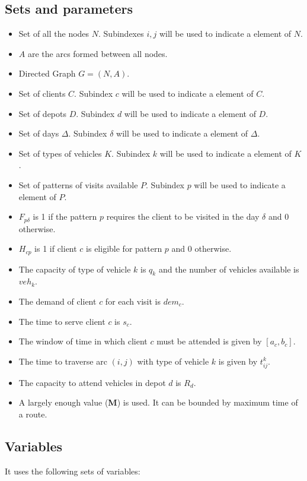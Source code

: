 \documentclass[preprint,review,12pt]{elsarticle}
\begin{document}
\subsection{Sets and parameters}
\begin{itemize}
	\item Set of all the nodes $N$. Subindexes $i,j$ will be used to indicate a element of $N$.
	\item $A$ are the arcs formed between all nodes.
	\item Directed Graph $G = (N,A)$.
	\item Set of clients $C$. Subindex $c$ will be used to indicate a element of $C$.
	\item Set of depots $D$. Subindex $d$ will be used to indicate a element of $D$.
	\item Set of days  $\Delta$. Subindex $\delta$ will be used to indicate a element of $\Delta$.
	\item Set of types of vehicles $K$. Subindex $k$ will be used to indicate a element of $K$.
	\item Set of patterns of visits available $P$. Subindex $p$ will be used to indicate a element of $P$.
	\item $F_{p\delta}$ is 1 if the pattern $p$ requires the client to be visited in the day $\delta$ and 0 otherwise.
	\item $H_{cp}$ is 1 if client $c$ is eligible for pattern $p$ and 0 otherwise.
	\item The capacity of type of vehicle $k$ is $q_k$ and the number of vehicles available is $veh_k$.
	\item The demand of client $c$ for each visit is $dem_c$.
	\item The time to serve client $c$ is $s_c$.
	\item The window of time in which client $c$ must be attended is given by $[a_c,b_c]$.
	\item The time to traverse arc $(i,j)$ with type of vehicle $k$ is given by $t_{ij}^k$.
	\item The capacity to attend vehicles in depot $d$ is $R_d$.
	\item A largely enough value (\textbf{M}) is used. It can be bounded by maximum time of a route.
	
	
\end{itemize}

\subsection{Variables}
It uses the following sets of variables:
\end{document}
